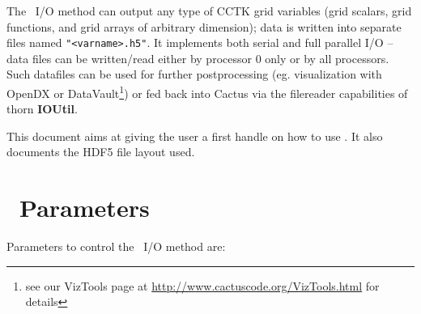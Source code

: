 \documentclass{article}
\begin{document}
The \ThisThorn\ I/O method can output any type of CCTK grid variables
(grid scalars, grid functions, and grid arrays of arbitrary dimension);
data is written into separate files named {\tt "<varname>.h5"}.
It implements both serial and full parallel I/O --
data files can be written/read either by processor 0 only or by all processors.
Such datafiles can be used for further postprocessing (eg. visualization with
OpenDX or DataVault\footnote{see our VizTools page at \url{http://www.cactuscode.org/VizTools.html}
for details}) or fed back into Cactus via the filereader capabilities of thorn
{\bf IOUtil}.

This document aims at giving the user a first handle on how to use
\ThisThorn. It also documents the HDF5 file layout used.


\section{\ThisThorn\ Parameters}

Parameters to control the \ThisThorn\ I/O method are:
\end{document}
